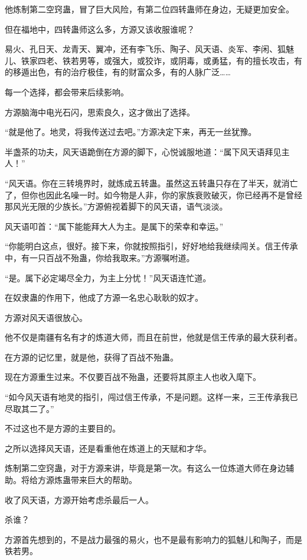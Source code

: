 \begin{this_body}
他炼制第二空窍蛊，冒了巨大风险，有第二位四转蛊师在身边，无疑更加安全。

但在福地中，四转蛊师这么多，方源又该收服谁呢？

易火、孔日天、龙青天、翼冲，还有李飞乐、陶子、风天语、炎军、李闲、狐魅儿、铁家四老、铁若男等，或强大，或狡诈，或阴毒，或勇猛，有的擅长攻击，有的移遁出色，有的治疗极佳，有的财富众多，有的人脉广泛……

每一个选择，都会带来后续影响。

方源脑海中电光石闪，思索良久，这才做出了选择。

“就是他了。地灵，将我传送过去吧。”方源决定下来，再无一丝犹豫。

半盏茶的功夫，风天语跪倒在方源的脚下，心悦诚服地道：“属下风天语拜见主人！”

“风天语。你在三转境界时，就炼成五转蛊。虽然这五转蛊只存在了半天，就消亡了，但你也因此名噪一时。如今物是人非，你的家族衰败破灭，你已经再不是曾经那风光无限的少族长。”方源俯视着脚下的风天语，语气淡淡。

风天语叩首：“属下能能拜大人为主。是属下的荣幸和幸运。”

“你能明白这点，很好。接下来，你就按照指引，好好地给我继续闯关。信王传承中，有一只百战不殆蛊，你给我取来。”方源嘱咐道。

“是。属下必定竭尽全力，为主上分忧！”风天语连忙道。

在奴隶蛊的作用下，他成了方源一名忠心耿耿的奴才。

方源对风天语很放心。

他不仅是南疆有名有才的炼道大师，而且在前世，他就是信王传承的最大获利者。

在方源的记忆里，就是他，获得了百战不殆蛊。

现在方源重生过来。不仅要百战不殆蛊，还要将其原主人也收入麾下。

“如今风天语有地灵的指引，闯过信王传承，不是问题。这样一来，三王传承我已尽取其二了。”

不过这也不是方源的主要目的。

之所以选择风天语，还是看重他在炼道上的天赋和才华。

炼制第二空窍蛊，对于方源来讲，毕竟是第一次。有这么一位炼道大师在身边辅助。将给方源炼蛊带来巨大的帮助。

收了风天语，方源开始考虑杀最后一人。

杀谁？

方源首先想到的，不是战力最强的易火，也不是最有影响力的狐魅儿和陶子，而是铁若男。


\end{this_body}
